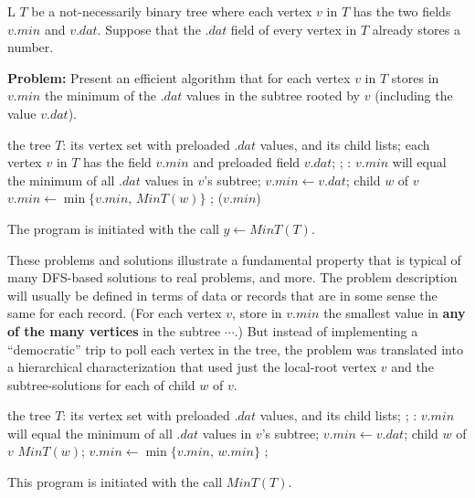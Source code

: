 
L $T$ be a not-necessarily binary tree where each vertex $v$ in $T$ has the two fields $v.min$ and $v.dat$. 
Suppose that the $.dat$ field of every vertex in $T$ already stores a number.

\noindent
{\bf Problem:} Present an efficient algorithm that for each vertex $v$ in $T$ stores in $v.min$ the minimum of the $.dat$ values in
the subtree rooted by $v$ (including the value $v.dat$).

\noindent
\Prog\qq     %
\Global the tree $T$: its vertex set with preloaded $.dat$ values, and its child lists;\qq
\phantom{\Global }each vertex $v$ in $T$ has the field $v.min$ and preloaded field $v.dat$;\qq
{};\qq     %
\OUTPUT: $v.min$ will equal the minimum of all $.dat$ values in $v$'s subtree;\qq
$v.min\leftarrow v.dat$;\qq
\Foreach child ${w}$ of $v$ \Do\qq
$v.min\leftarrow \min\{v.min,\,MinT(w)\}$\qq
\Endfor;\qq
\Return($v.min$)\qq
\Fini %

The program is initiated with the call $y\leftarrow MinT(T)$.


These problems and solutions illustrate a fundamental property that is typical of many DFS-based solutions to real problems, and more. The
problem description will usually be defined in terms 
of data or records that are in some sense the same for each record.
(For each vertex $v$, store in $v.min$ the smallest value in {\bf any of the many vertices} in the subtree $\cdots$.)
But instead of implementing a ``democratic'' trip to poll each vertex in the tree, the problem was translated into a hierarchical characterization
that used just the local-root vertex $v$ and the subtree-solutions for each of child $w$ of $v$.

\noindent
\Prog\qq
\Global the tree $T$: its vertex set with preloaded $.dat$ values, and its child lists;\qq
{};\qq
\OUTPUT: $v.min$ will equal the minimum of all $.dat$ values in $v$'s subtree;\p
$v.min\leftarrow v.dat$;\p
\Foreach child ${w}$ of $v$ \Do\p
$MinT(w)$;\p
$v.min\leftarrow \min\{v.min,\,w.min\}$\p
\Endfor; \qq
\Fini

This program is initiated with the call $MinT(T)$.


